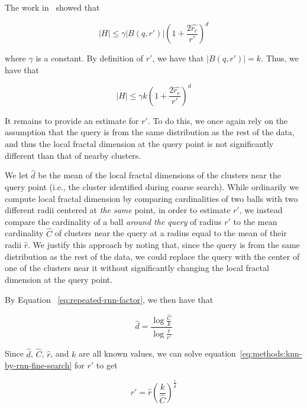 The work in~\cite{yu2015entropy} showed that

\begin{equation*}
    |H| \leq \gamma |B(q, r')|\left(1+ \frac{2\hat{r_c}}{r'}\right)^d
\end{equation*}

where $\gamma$ is a constant. 
By definition of 
$r'$, we have that $|B(q, r')| = k$. Thus, we have that

\begin{equation}
    |H| \leq \gamma k\left(1+ \frac{2\hat{r_c}}{r'}\right)^d
    \label{eq:methods:knn-by-rnn-fine-search}
\end{equation}

It remains to provide an estimate for $r'$. 
To do this, we once again rely on the assumption that the query is from the same distribution as the rest of the data, and thus the local fractal dimension at the query point is not significantly different than that of nearby clusters.

We let $\hat{d}$ be the mean of the local fractal dimensions of the clusters near the query point (i.e., the cluster identified during coarse search).
While ordinarily we compute local fractal dimension by comparing cardinalities of two balls with two different radii centered at \emph{the same} point, in order to estimate $r'$, we instead compare the cardinality of a ball \emph{around the query} of radius $r'$ to the mean cardinality $\hat{C}$ of clusters near the query at a radius equal to the mean of their radii $\hat{r}$.
We justify this approach by noting that, since the query is from the same distribution as the rest of the data, we could replace the query with the center of one of the clusters near it without significantly changing the local fractal dimension at the query point. 

By Equation ~\ref{eq:repeated-rnn-factor}, we then have that

\begin{equation*}
    \hat{d} = \frac{\log{}\frac{\hat{C}}{k}}{\log{}\frac{\hat{r}}{r'}}
\end{equation*}

Since $\hat{d}$, $\hat{C}$, $\hat{r}$, and $k$ are all known values, we can solve equation~\ref{eq:methods:knn-by-rnn-fine-search} for $r'$ to get

\begin{equation*}
    r' = \hat{r}\left(\frac{k}{\hat{C}}\right)^{\frac{1}{\hat{d}}}
\end{equation*}

